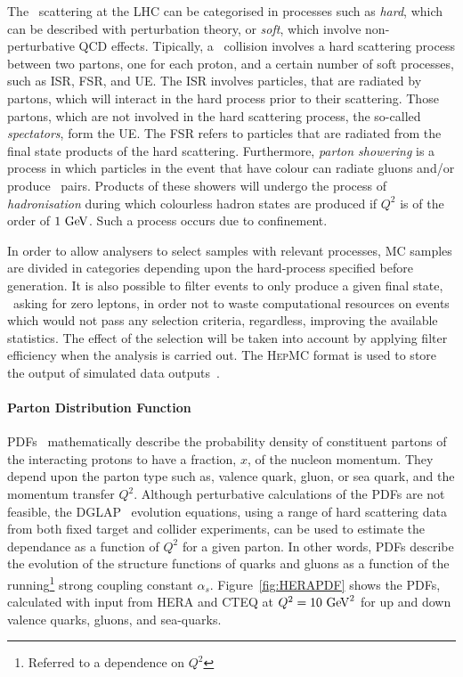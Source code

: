 		The \pp\ scattering at the \ac{LHC} can be categorised in processes such as \emph{hard}, which can be described with perturbation theory, or \emph{soft}, which involve non-perturbative \ac{QCD} effects. Tipically, a \pp\ collision involves a hard scattering process between two partons, one for each proton, and a certain number of soft processes, such as \ac{ISR}, \ac{FSR}, and \ac{UE}. The \ac{ISR} involves particles, that are radiated by partons, which will interact in the hard process prior to their scattering. Those partons, which are not involved in the hard scattering process, the so-called \emph{spectators}, form the \ac{UE}. The \ac{FSR} refers to particles that are radiated from the final state products of the hard scattering. Furthermore, \emph{parton showering} is a process in which particles in the event that have colour can radiate gluons and/or produce \qqbar\ pairs. Products of these showers will undergo the process of \emph{hadronisation} during which colourless hadron states are produced if $Q^2$ is of the order of $1 \GeV$. Such a process occurs due to confinement. 

		In order to allow analysers to select samples with relevant processes, \ac{MC} samples are divided in categories depending upon the hard-process specified before generation. It is also possible to filter events to only produce a given final state, \eg\ asking for zero leptons, in order not to waste computational resources on events which would not pass any selection criteria, regardless, improving the available statistics. The effect of the selection will be taken into account by applying filter efficiency when the analysis is carried out. The \textsc{HepMC} format is used to store the output of simulated data outputs~\cite{DOBBS200141}.

			\paragraph*{Parton Distribution Function}

				\ac{PDFs}~\cite{Campbell2007} mathematically describe the probability density of constituent partons of the interacting protons to have a fraction, $x$, of the nucleon momentum. They depend upon the parton type such as, valence quark, gluon, or sea quark, and the momentum transfer $Q^2$. Although perturbative calculations of the \ac{PDFs} are not feasible, the \textsc{DGLAP}~\cite{Gribov:1972ri, Altarelli:1977zs} evolution equations, using a range of hard scattering data from both fixed target and collider experiments, can be used to estimate the dependance as a function of $Q^2$ for a given parton. In other words, \ac{PDFs} describe the evolution of the structure functions of quarks and gluons as a function of the running\footnote{Referred to a dependence on $Q^2$} strong coupling constant $\alpha_s$. Figure~\ref{fig:HERAPDF} shows the \ac{PDFs}, calculated with input from \textsc{HERA} and \textsc{CTEQ} at $Q^2 = 10 \GeV^2$ for up and down valence quarks, gluons, and sea-quarks.

